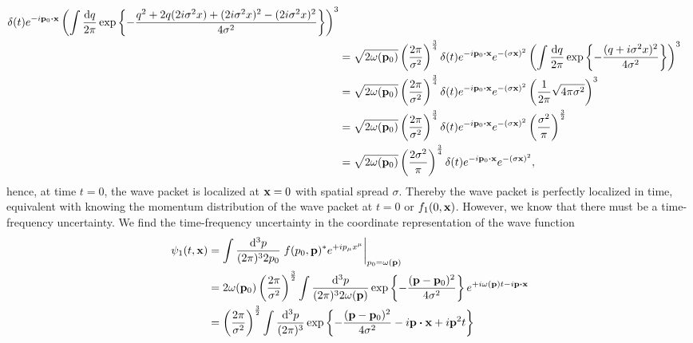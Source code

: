 \begin{example}
\begin{equation*}
\begin{split}
			\delta(t)
			e^{-i\vb{p}_0\vdot\vb{x}}
			\left(
				\int\frac{\dd{q}}{2\pi}
				\exp\left\{
					-
					\frac{q^2+2q(2i\sigma^2x)+(2i\sigma^2x)^2-(2i\sigma^2x)^2}{4\sigma^2}
				\right\}
			\right)^3
			\\
			&=
			\sqrt{2\omega(\vb{p}_0)}
			\left(\frac{2\pi}{\sigma^2}\right)^{\frac{3}{4}}
			\delta(t)
			e^{-i\vb{p}_0\vdot\vb{x}}
			e^{-(\sigma\vb{x})^2}
			\left(
				\int\frac{\dd{q}}{2\pi}
				\exp\left\{
					-
					\frac{(q+i\sigma^2x)^2}{4\sigma^2}
				\right\}
			\right)^3
			\\
			&=
			\sqrt{2\omega(\vb{p}_0)}
			\left(\frac{2\pi}{\sigma^2}\right)^{\frac{3}{4}}
			\delta(t)
			e^{-i\vb{p}_0\vdot\vb{x}}
			e^{-(\sigma\vb{x})^2}
			\left(
				\frac{1}{2\pi}
				\sqrt{4\pi\sigma^2}
			\right)^3
			\\
			&=
			\sqrt{2\omega(\vb{p}_0)}
			\left(\frac{2\pi}{\sigma^2}\right)^{\frac{3}{4}}
			\delta(t)
			e^{-i\vb{p}_0\vdot\vb{x}}
			e^{-(\sigma\vb{x})^2}
			\left(
				\frac{\sigma^2}{\pi}
			\right)^\frac{3}{2}
			\\
			&=
			\sqrt{2\omega(\vb{p}_0)}
			\left(\frac{2\sigma^2}{\pi}\right)^{\frac{3}{4}}
			\delta(t)
			e^{-i\vb{p}_0\vdot\vb{x}}
			e^{-(\sigma\vb{x})^2}
			,
		\end{split}
	\end{equation*}
	hence, at time $t=0$, the wave packet is localized at $\vb{x}=0$ with spatial spread $\sigma$.
	Thereby the wave packet is perfectly localized in time, equivalent with knowing the momentum distribution of the wave packet at $t=0$ or $f_1(0,\vb{x})$.
	However, we know that there must be a time-frequency uncertainty.
	We find the time-frequency uncertainty in the coordinate representation of the wave function
	\begin{equation*}
		\begin{split}
			\psi_1(t,\vb{x})
			&=
			\int\frac{\dd[3]{p}}{(2\pi)^32p_0}
			\eval{
				f(p_0,\vb{p})^*
				e^{+ip_\mu x^\mu}
			}_{p_0=\omega(\vb{p})}
			\\
			&=
			2\omega(\vb{p}_0)
			\left(\frac{2\pi}{\sigma^2}\right)^{\frac{3}{2}}
			\int\frac{\dd[3]{p}}{(2\pi)^32\omega(\vb{p})}
			\exp\left\{
				-
				\frac{(\vb{p}-\vb{p}_0)^2}{4\sigma^2}
			\right\}
			e^{+i\omega(\vb{p})t-i\vb{p}\vdot\vb{x}}
			\\
			&=
			\left(\frac{2\pi}{\sigma^2}\right)^{\frac{3}{2}}
			\int\frac{\dd[3]{p}}{(2\pi)^3}
			\exp\left\{
				-
				\frac{(\vb{p}-\vb{p}_0)^2}{4\sigma^2}
				-
				i\vb{p}\vdot\vb{x}
				+
				i\vb{p}^2t
			\right\}
			\\

\end{split}
\end{equation*}
\end{example}
